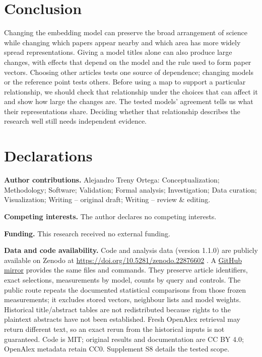 \documentclass[12pt]{article}
\begin{document}
\section{Conclusion}
Changing the embedding model can preserve the broad arrangement of science while changing which papers appear nearby and which area has more widely spread representations. Giving a model titles alone can also produce large changes, with effects that depend on the model and the rule used to form paper vectors. Choosing other articles tests one source of dependence; changing models or the reference point tests others. Before using a map to support a particular relationship, we should check that relationship under the choices that can affect it and show how large the changes are. The tested models' agreement tells us what their representations share. Deciding whether that relationship describes the research well still needs independent evidence.

\section*{Declarations}
\textbf{Author contributions.}
Alejandro Treny Ortega: Conceptualization; Methodology; Software; Validation; Formal analysis; Investigation; Data curation; Visualization; Writing -- original draft; Writing -- review \& editing.
\par\medskip
\textbf{Competing interests.}
The author declares no competing interests.
\par\medskip
\textbf{Funding.}
This research received no external funding.
\par\medskip
\textbf{Data and code availability.}
Code and analysis data (version 1.1.0) are publicly available on Zenodo at \url{https://doi.org/10.5281/zenodo.22876602} \citep{treny2026reproduction}. A \href{https://github.com/aleetreny/Shape-of-Science-Reproducibility}{GitHub mirror} provides the same files and commands. They preserve article identifiers, exact selections, measurements by model, counts by query and controls. The public route repeats the documented statistical comparisons from those frozen measurements; it excludes stored vectors, neighbour lists and model weights. Historical title/abstract tables are not redistributed because rights to the plaintext abstracts have not been established. Fresh OpenAlex retrieval may return different text, so an exact rerun from the historical inputs is not guaranteed. Code is MIT; original results and documentation are CC BY 4.0; OpenAlex metadata retain CC0. Supplement S8 details the tested scope.


\begingroup
{}


\endgroup
\end{document}
